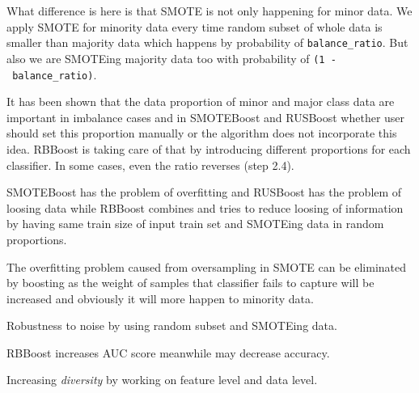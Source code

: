 \documentclass[11pt]{article}
\begin{document}
What difference is here is that SMOTE is not only happening for minor
data. We apply SMOTE for minority data every time random subset of whole
data is smaller than majority data which happens by probability of
\texttt{balance\_ratio}. But also we are SMOTEing majority data too with
probability of \texttt{(1\ -\ balance\_ratio)}.

It has been shown that the data proportion of minor and major class data
are important in imbalance cases and in SMOTEBoost and RUSBoost whether
user should set this proportion manually or the algorithm does not
incorporate this idea. RBBoost is taking care of that by introducing
different proportions for each classifier. In some cases, even the ratio
reverses (step 2.4).

SMOTEBoost has the problem of overfitting and RUSBoost has the problem
of loosing data while RBBoost combines and tries to reduce loosing of
information by having same train size of input train set and SMOTEing
data in random proportions.

The overfitting problem caused from oversampling in SMOTE can be
eliminated by boosting as the weight of samples that classifier fails to
capture will be increased and obviously it will more happen to minority
data.

Robustness to noise by using random subset and SMOTEing data.

RBBoost increases AUC score meanwhile may decrease accuracy.

Increasing \emph{diversity} by working on feature level and data level.
\end{document}
